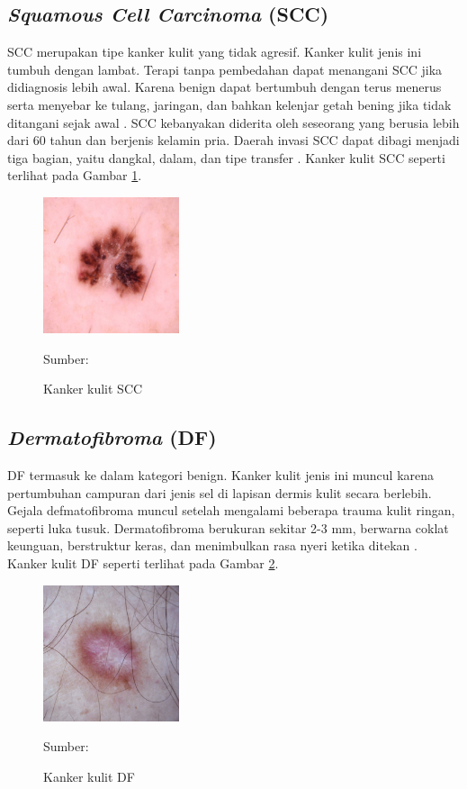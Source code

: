     \subsection{\textit{Squamous Cell Carcinoma} (SCC)}
    SCC merupakan tipe kanker kulit yang tidak agresif. Kanker kulit jenis ini tumbuh dengan lambat. Terapi tanpa pembedahan dapat menangani SCC jika didiagnosis lebih awal. Karena benign dapat bertumbuh dengan terus menerus serta menyebar ke tulang, jaringan, dan bahkan kelenjar getah bening jika tidak ditangani sejak awal \citep{Fuadah2020a}. SCC kebanyakan diderita oleh seseorang yang berusia lebih dari 60 tahun dan berjenis kelamin pria. Daerah invasi SCC dapat dibagi menjadi tiga bagian, yaitu dangkal, dalam, dan tipe transfer \citep{Sang2019}. Kanker kulit SCC seperti terlihat pada Gambar \ref{fig:scc}.
    \begin{figure}[H] 
        \begin{center} 
            \includegraphics[width=4cm]{../img/Skin Cancer SCC - Latex.jpg}
            \caption{Kanker kulit SCC} 
            \label{fig:scc}
            Sumber: \citep{Codella2018,Combalia2019,Tschandl2018}
        \end{center} 
    \end{figure}

    \subsection{\textit{Dermatofibroma} (DF)}
    DF termasuk ke dalam kategori benign. Kanker kulit jenis ini muncul karena pertumbuhan campuran dari jenis sel di lapisan dermis kulit secara berlebih. Gejala defmatofibroma muncul setelah mengalami beberapa trauma kulit ringan, seperti luka tusuk. Dermatofibroma berukuran sekitar 2-3 mm, berwarna coklat keunguan, berstruktur keras, dan menimbulkan rasa nyeri ketika ditekan \citep{Fuadah2020a}. Kanker kulit DF seperti terlihat pada Gambar \ref{fig:df}.
    \begin{figure}[H] 
        \begin{center} 
            \includegraphics[width=4cm]{../img/Skin Cancer DF - Latex.jpg}
            \caption{Kanker kulit DF} 
            \label{fig:df}
            Sumber: \citep{Codella2018,Combalia2019,Tschandl2018}
        \end{center} 
    \end{figure}

